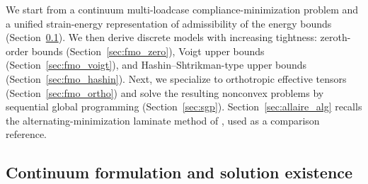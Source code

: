 \documentclass[preprint,3p]{elsarticle}
\begin{document}
We start from a continuum multi-loadcase compliance-minimization problem and a unified strain-energy representation of admissibility of the energy bounds (Section~\ref{sec:cont_fmo}). We then derive discrete models with increasing tightness: zeroth-order bounds (Section~\ref{sec:fmo_zero}), Voigt upper bounds (Section~\ref{sec:fmo_voigt}), and Hashin--Shtrikman-type upper bounds (Section~\ref{sec:fmo_hashin}). Next, we specialize to orthotropic effective tensors (Section~\ref{sec:fmo_ortho}) and solve the resulting nonconvex problems by sequential global programming (Section~\ref{sec:sgp}). Section~\ref{sec:allaire_alg} recalls the alternating-minimization laminate method of \citet{Burazin2021}, used as a comparison reference.

\subsection{Continuum formulation and solution existence}\label{sec:cont_fmo}
\end{document}
